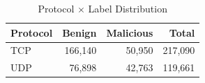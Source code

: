 \begin{table}[htbp]
\centering
\caption{Protocol $\times$ Label Distribution}\label{tab:proto_label}
\begin{tabular}{lrrr}
\toprule
\textbf{Protocol} & \textbf{Benign} & \textbf{Malicious} & \textbf{Total} \\
\midrule
TCP & 166,140 & 50,950 & 217,090 \\
UDP & 76,898 & 42,763 & 119,661 \\
\bottomrule
\end{tabular}
\end{table}
